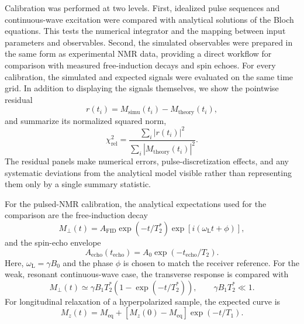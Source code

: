 Calibration was performed at two levels.  First, idealized pulse sequences
and continuous-wave excitation were compared with analytical solutions of
the Bloch equations.  This tests the numerical integrator and the mapping
between input parameters and observables.  Second, the simulated observables
were prepared in the same form as experimental NMR data, providing a direct
workflow for comparison with measured free-induction decays and spin echoes.
For every calibration, the simulated and expected signals were evaluated on
the same time grid.  In addition to displaying the signals themselves, we
show the pointwise residual
\begin{equation}
    r(t_i) = M_{\mathrm{simu}}(t_i)-M_{\mathrm{theory}}(t_i),
    \label{eq:calibration_residual_revision}
\end{equation}
and summarize its normalized squared norm,
\begin{equation}
    \chi^2_{\mathrm{rel}}
    = \frac{\sum_i |r(t_i)|^2}
    {\sum_i |M_{\mathrm{theory}}(t_i)|^2}.
    \label{eq:calibration_chisq_revision}
\end{equation}
The residual panels make numerical errors, pulse-discretization effects, and
any systematic deviations from the analytical model visible rather than
representing them only by a single summary statistic.

For the pulsed-NMR calibration, the analytical expectations used for the
comparison are the free-induction decay
\begin{equation}
    M_{\perp}(t) = A_{\mathrm{FID}}
    \exp(-t/T_2^*)\exp\!\left[i(\omega_{\mathrm{L}}t+\phi)\right],
    \label{eq:fid_expectation_revision}
\end{equation}
and the spin-echo envelope
\begin{equation}
    A_{\mathrm{echo}}(t_{\mathrm{echo}})
    = A_0\exp(-t_{\mathrm{echo}}/T_2).
    \label{eq:echo_expectation_revision}
\end{equation}
Here, $\omega_{\mathrm{L}}=\gamma B_0$ and the phase $\phi$ is chosen to
match the receiver reference.  For the weak, resonant continuous-wave case,
the transverse response is compared with
\begin{equation}
    M_{\perp}(t) \simeq \gamma B_1 T_2^*
    \left(1-\exp(-t/T_2^*)\right),
    \qquad \gamma B_1T_2^*\ll 1.
    \label{eq:cw_expectation_revision}
\end{equation}
For longitudinal relaxation of a hyperpolarized sample, the expected curve is
\begin{equation}
    M_z(t)=M_{\mathrm{eq}}
    +\left[M_z(0)-M_{\mathrm{eq}}\right]\exp(-t/T_1).
    \label{eq:t1_expectation_revision}
\end{equation}

